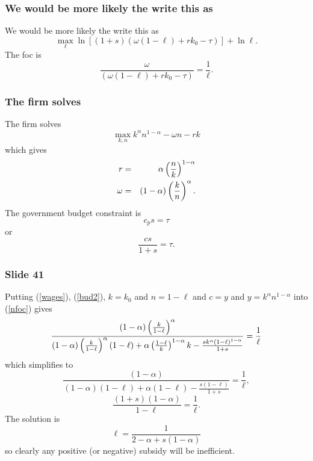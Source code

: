\documentclass[aspectratio=169]{ltx-talk}
\begin{document}
\begin{frame}
\frametitle{We would be more likely the write this as}
We would be more likely the write this as 
\begin{equation*}
\underset{\ell }{\max }\ln \left[ \left( 1+s\right) \left( \omega \left(
1-\ell \right) +rk_{0}-\tau \right) \right] +\ln \ell .
\end{equation*}%
The foc is 
\begin{equation}
\frac{\omega }{\left( \omega \left( 1-\ell \right) +rk_{0}-\tau \right) }=%
\frac{1}{\ell }.  \label{nfoc}
\end{equation}%
\end{frame}

\begin{frame}
\frametitle{The firm solves}
The firm solves%
\begin{equation*}
\underset{k,n}{\max }k^{\alpha }n^{1-\alpha }-\omega n-rk
\end{equation*}%
which gives 
\begin{eqnarray}
r &=&\alpha \left( \frac{n}{k}\right) ^{1-\alpha }  \label{wages} \\
\omega &=&\left( 1-\alpha \right) \left( \frac{k}{n}\right) ^{\alpha }. 
\notag
\end{eqnarray}%
The government budget constraint is%
\begin{equation*}
c_{p}s=\tau
\end{equation*}%
or 
\begin{equation}
\frac{cs}{1+s}=\tau .  \label{bud2}
\end{equation}%
\end{frame}

\begin{frame}
\frametitle{Slide 41}
Putting (\ref{wages}), (\ref{bud2}), $k=k_{0}$ and $n=1-\ell $ and $c=y$ and 
$y=k^{\alpha }n^{1-\alpha }$ into (\ref{nfoc}) gives 
\begin{equation*}
\frac{\left( 1-\alpha \right) \left( \frac{k}{1-\ell }\right) ^{\alpha }}{%
\left( 1-\alpha \right) \left( \frac{k}{1-\ell }\right) ^{\alpha }\left(
1-\ell \right) +\alpha \left( \frac{1-\ell }{k}\right) ^{1-\alpha }k-\frac{%
sk^{\alpha }\left( 1-\ell \right) ^{1-\alpha }}{1+s}}=\frac{1}{\ell }
\end{equation*}%
which simplifies to 
\begin{equation*}
\frac{\left( 1-\alpha \right) }{\left( 1-\alpha \right) \left( 1-\ell
\right) +\alpha \left( 1-\ell \right) -\frac{s\left( 1-\ell \right) }{1+s}}=%
\frac{1}{\ell },
\end{equation*}%
\begin{equation*}
\frac{\left( 1+s\right) \left( 1-\alpha \right) }{1-\ell }=\frac{1}{\ell }.
\end{equation*}%
The solution is 
\begin{equation*}
\ell =\frac{1}{2-\alpha +s\left( 1-\alpha \right) }
\end{equation*}%
so clearly any positive (or negative) subsidy will be inefficient.
\end{frame}
\end{document}
